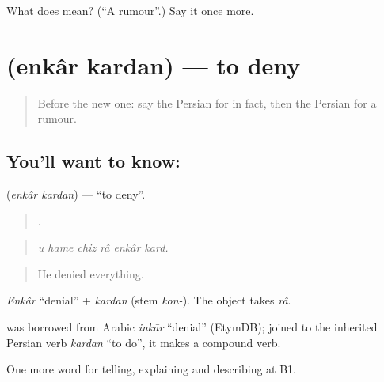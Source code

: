 \begin{tcolorbox}[breakable,colback=teal!4,colframe=teal!35!black,title={Before you move on}]
What does  mean? (\textquotedblleft{}A rumour\textquotedblright{}.) Say it once more.
\end{tcolorbox}
\section[\texorpdfstring{\fa{انکار} \fa{کردن} (enkâr kardan)}{انکار کردن (enkâr kardan)}]{  (enkâr kardan) — to deny}

\label{lesson:FA-C364-enkar-kardan}



\begin{quote}
Before the new one: say the Persian for in fact, then the Persian for a rumour.
\end{quote}

\subsection*{You'll want to know:  }
\textbf{ } (\emph{enkâr kardan}) — \textquotedblleft{}to deny\textquotedblright{}.

\begin{quote}
     .
\end{quote}

\begin{quote}
\emph{u hame chiz râ enkâr kard.}
\end{quote}

\begin{quote}
He denied everything.
\end{quote}

\emph{Enkâr} \textquotedblleft{}denial\textquotedblright{} + \emph{kardan} (stem \emph{kon-}). The object takes \emph{râ}.

\begin{cousinweb}
\textbf{} was borrowed from Arabic \emph{inkār} \textquotedblleft{}denial\textquotedblright{} (EtymDB); joined to the inherited Persian verb \emph{kardan} \textquotedblleft{}to do\textquotedblright{}, it makes a compound verb.
\end{cousinweb}

\begin{grammarlens}[title={What you've built}]
One more word for telling, explaining and describing at B1.
\end{grammarlens}

